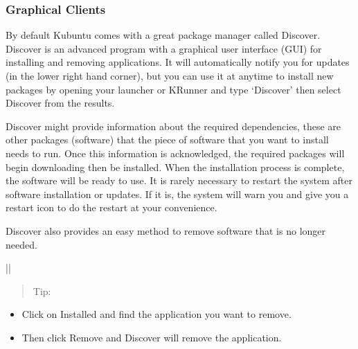 \documentclass[letterpaper,10pt,english]{sphinxmanual}
\begin{document}
\subsubsection{Graphical Clients}
\label{\detokenize{docs/software-management/software:graphical-clients}}
\sphinxAtStartPar
By default Kubuntu comes with a great package manager called Discover. Discover is an advanced program with a graphical user interface (GUI) for installing and removing applications. It will automatically notify you for updates (in the lower right hand corner), but you can use it at anytime to install new packages by opening your launcher or KRunner and type ‘Discover’ then select  Discover from the results.

\noindent{}

\sphinxAtStartPar
Discover might provide information about the required dependencies, these are other packages (software) that the piece of software that you want to install needs to run. Once this information is acknowledged, the required packages will begin downloading then be installed. When the installation process is complete, the software will be ready to use. It is rarely necessary to restart the system after software installation or updates. If it is, the system will warn you and give you a restart icon to do the restart at your convenience.

\sphinxAtStartPar
Discover also provides an easy method to remove software that is no longer needed.


\begin{savenotes}\sphinxattablestart
\centering
\begin{tabular}[t]{|*{1}{|}}
\hline
\begin{quote}

\sphinxAtStartPar
Tip:
\end{quote}
\begin{itemize}
\item {} 
\sphinxAtStartPar
Click on Installed and find the application you want to remove.

\item {} 
\sphinxAtStartPar
Then click Remove and Discover will remove the application.

\end{itemize}
\\
\hline
\end{tabular}
\par
\sphinxattableend\end{savenotes}
\end{document}
